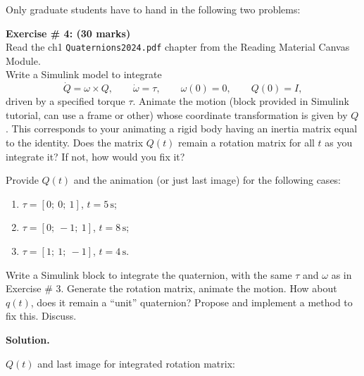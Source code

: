 \documentclass[11pt]{article}
\begin{document}
\vspace{12pt}
\noindent Only graduate students have to hand in the following two problems:

\vspace{10pt}
\noindent \textbf{Exercise \# 4: (30 marks)}\\
Read the ch1 \texttt{Quaternions2024.pdf} chapter from the Reading Material Canvas Module.\\
Write a Simulink model to integrate
\[
\dot Q = \omega \times Q,\qquad \dot\omega = \tau,\qquad \omega(0)=0,\qquad Q(0)=I,
\]
driven by a specified torque $\tau$.
Animate the motion (block provided in Simulink tutorial, can use a frame or other) whose
coordinate transformation is given by $Q$. This corresponds to your animating a rigid body
having an inertia matrix equal to the identity.
Does the matrix $Q(t)$ remain a rotation matrix for all $t$ as you integrate it?
If not, how would you fix it?

\vspace{6pt}
Provide $Q(t)$ and the animation (or just last image) for the following cases:
\begin{enumerate}[label=(\alph*)]
\item $\tau = [0;\ 0;\ 1]$, $t=5\,\mathrm{s}$;
\item $\tau = [0;\ -1;\ 1]$, $t=8\,\mathrm{s}$;
\item $\tau = [1;\ 1;\ -1]$, $t=4\,\mathrm{s}$.
\end{enumerate}

Write a Simulink block to integrate the quaternion, with the same $\tau$ and $\omega$ as in Exercise \# 3.
Generate the rotation matrix, animate the motion.
How about $q(t)$, does it remain a ``unit'' quaternion?
Propose and implement a method to fix this. Discuss.


\textbf{Solution.}

$Q(t)$ and last image for integrated rotation matrix:

\end{document}
